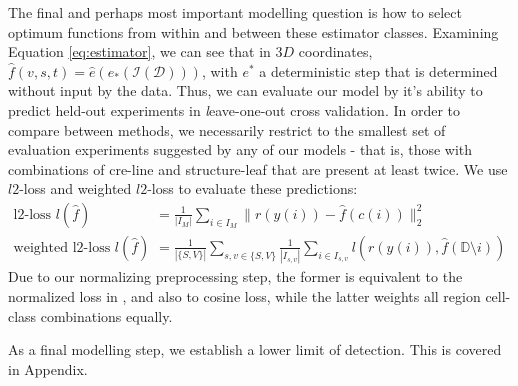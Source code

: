 \documentclass[NETN,manuscript]{stjour-new}
\begin{document}


The final and perhaps most important modelling question is how to select optimum functions from within and between these estimator classes.
Examining Equation \ref{eq:estimator}, we can see that in $3D$ coordinates, $\widehat f(v,s,t) = \widehat e (e_*(\mathcal{I} (\mathcal D)))$, with $e^*$ a deterministic step that is determined without input by the data.
Thus, we can evaluate our model by it's ability to predict held-out experiments in {\textit leave-one-out cross validation}.
In order to compare between methods, we necessarily restrict to the smallest set of evaluation experiments suggested by any of our models - that is, those with combinations of cre-line and structure-leaf that are present at least twice.
We use $l2$-loss and weighted $l2$-loss to evaluate these predictions:
\begin{align*}
\text{l2-loss } l ( \hat f) &= \frac{1}{|I_M|} \sum_{i \in I_M} \| r(y(i)) - \hat f(c(i)) \|_2^2 \\
\text{weighted l2-loss } l ( \hat f) &= \frac{1}{|\{S,V\}|} \sum_{s,v \in \{S,V\}} \frac{1}{ |I_{s,v}|} \sum_{i \in I_{s,v} } l(r(y(i)), \hat f(\mathbb D \setminus i)) 
\end{align*}
Due to our normalizing preprocessing step, the former is equivalent to the normalized loss in \citet{Knox2019-ot}, and also to cosine loss, while the latter weights all region cell-class combinations equally.

As a final modelling step, we establish a lower limit of detection.
This is covered in Appendix.
\end{document}
